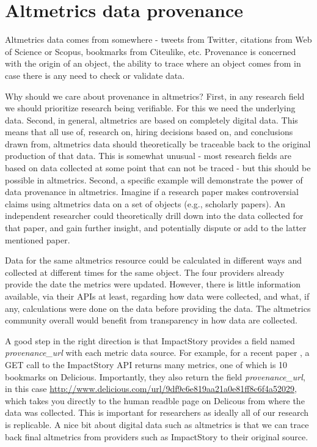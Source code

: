\documentclass[letterpaper,superscriptaddress,showkeys,longbibliography]{revtex4-1}\usepackage{graphicx, color}
\begin{document}
\section*{Altmetrics data provenance}

Altmetrics data comes from somewhere - tweets from Twitter, citations from Web of Science or Scopus, bookmarks from Citeulike, etc. Provenance is concerned with the origin of an object, the ability to trace where an object comes from in case there is any need to check or validate data. 

Why should we care about provenance in altmetrics?  First, in any research field we should prioritize research being verifiable. For this we need the underlying data. Second, in general, altmetrics are based on completely digital data. This means that all use of, research on, hiring decisions based on, and conclusions drawn from, altmetrics data should theoretically be traceable back to the original production of that data. This is somewhat unusual - most research fields are based on data collected at some point that can not be traced - but this should be possible in altmetrics. Second, a specific example will demonstrate the power of data provenance in altmetrics. Imagine if a research paper makes controversial claims using altmetrics data on a set of objects (e.g., scholarly papers). An independent researcher could theoretically drill down into the data collected for that paper, and gain further insight, and potentially dispute or add to the latter mentioned paper.

Data for the same altmetrics resource could be calculated in different ways and collected at different times for the same object. The four providers already provide the date the metrics were updated. However, there is little information available, via their APIs at least, regarding how data were collected, and what, if any, calculations were done on the data before providing the data. The altmetrics community overall would benefit from transparency in how data are collected. 

A good step in the right direction is that ImpactStory provides a field named \emph{provenance\_url} with each metric data source. For example, for a recent paper \cite{piwowar2007}, a GET call to the ImpactStory API returns many metrics, one of which is 10 bookmarks on Delicious. Importantly, they also return the field \emph{provenance\_url}, in this case \url{http://www.delicious.com/url/9df9c6e819aa21a0e81ff8c6f4a52029}, which takes you directly to the human readble page on Delicous from where the data was collected. This is important for researchers as ideally all of our research is replicable. A nice bit about digital data such as altmetrics is that we can trace back final altmetrics from providers such as ImpactStory to their original source.
\end{document}
